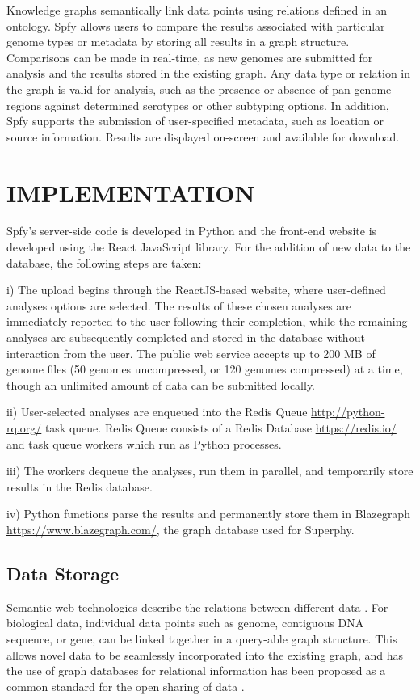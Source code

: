 \documentclass{article}
\begin{document}
Knowledge graphs semantically link data points using relations defined in an ontology. Spfy allows users to compare the results associated with particular genome types or metadata by storing all results in a graph structure. Comparisons can be made in real-time, as new genomes are submitted for analysis and the results stored in the existing graph. Any data type or relation in the graph is valid for analysis, such as the presence or absence of pan-genome regions against determined serotypes or other subtyping options. In addition, Spfy supports the submission of user-specified metadata, such as location or source information. Results are displayed on-screen and available for download.

\section{IMPLEMENTATION}
Spfy's server-side code is developed in Python and the front-end website is developed using the React JavaScript library. For the addition of new data to the database, the following steps are taken:

i) The upload begins through the ReactJS-based website, where user-defined analyses options are selected. The results of these chosen analyses are immediately reported to the user following their completion, while the remaining analyses are subsequently completed and stored in the database without interaction from the user. The public web service accepts up to 200 MB of genome files (50 genomes uncompressed, or 120 genomes compressed) at a time, though an unlimited amount of data can be submitted locally.

ii) User-selected analyses are enqueued into the Redis Queue \url{http://python-rq.org/} task queue. Redis Queue consists of a Redis Database \url{https://redis.io/} and task queue workers which run as Python processes.

iii) The workers dequeue the analyses, run them in parallel, and temporarily store results in the Redis database.

iv) Python functions parse the results and permanently store them in Blazegraph \url{https://www.blazegraph.com/}, the graph database used for Superphy.

\subsection{Data Storage}
Semantic web technologies describe the relations between different data \cite{berners2001semantic}. For biological data, individual data points such as genome, contiguous DNA sequence, or gene, can be linked together in a query-able graph structure. This allows novel data to be seamlessly incorporated into the existing graph, and has the use of graph databases for relational information has been proposed as a common standard for the open sharing of data \cite{horrocks2005semantic}.
\end{document}
